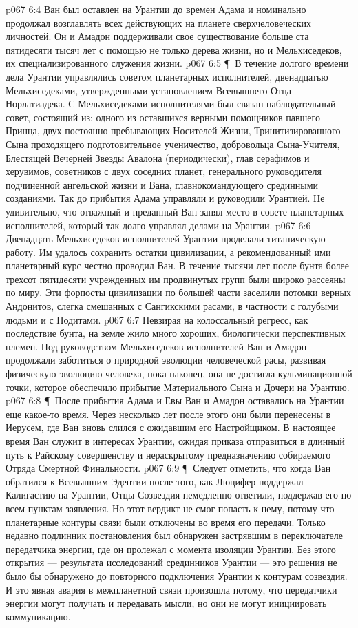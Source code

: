 \vs p067 6:4 Ван был оставлен на Урантии до времен Адама и номинально продолжал возглавлять всех действующих на планете сверхчеловеческих личностей. Он и Амадон поддерживали свое существование больше ста пятидесяти тысяч лет с помощью не только дерева жизни, но и Мельхиседеков, их специализированного служения жизни.
\vs p067 6:5 \P\ В течение долгого времени дела Урантии управлялись советом планетарных исполнителей, двенадцатью Мельхиседеками, утвержденными установлением Всевышнего Отца Норлатиадека. С Мельхиседеками\hyp{}исполнителями был связан наблюдательный совет, состоящий из: одного из оставшихся верными помощников павшего Принца, двух постоянно пребывающих Носителей Жизни, Тринитизированного Сына проходящего подготовительное ученичество, добровольца Сына\hyp{}Учителя, Блестящей Вечерней Звезды Авалона (периодически), глав серафимов и херувимов, советников с двух соседних планет, генерального руководителя подчиненной ангельской жизни и Вана, главнокомандующего срединными созданиями. Так до прибытия Адама управляли и руководили Урантией. Не удивительно, что отважный и преданный Ван занял место в совете планетарных исполнителей, который так долго управлял делами на Урантии.
\vs p067 6:6 Двенадцать Мельхиседеков\hyp{}исполнителей Урантии проделали титаническую работу. Им удалось сохранить остатки цивилизации, а рекомендованный ими планетарный курс честно проводил Ван. В течение тысячи лет после бунта более трехсот пятидесяти учрежденных им продвинутых групп были широко рассеяны по миру. Эти форпосты цивилизации по большей части заселили потомки верных Андонитов, слегка смешанных с Сангикскими расами, в частности с голубыми людьми и с Нодитами.
\vs p067 6:7 Невзирая на колоссальный регресс, как последствие бунта, на земле жило много хороших, биологически перспективных племен. Под руководством Мельхиседеков\hyp{}исполнителей Ван и Амадон продолжали заботиться о природной эволюции человеческой расы, развивая физическую эволюцию человека, пока наконец, она не достигла кульминационной точки, которое обеспечило прибытие Материального Сына и Дочери на Урантию.
\vs p067 6:8 \P\ После прибытия Адама и Евы Ван и Амадон оставались на Урантии еще какое\hyp{}то время. Через несколько лет после этого они были перенесены в Иерусем, где Ван вновь слился с ожидавшим его Настройщиком. В настоящее время Ван служит в интересах Урантии, ожидая приказа отправиться в длинный путь к Райскому совершенству и нераскрытому предназначению собираемого Отряда Смертной Финальности.
\vs p067 6:9 \P\ Следует отметить, что когда Ван обратился к Всевышним Эдентии после того, как Люцифер поддержал Калигастию на Урантии, Отцы Созвездия немедленно ответили, поддержав его по всем пунктам заявления. Но этот вердикт не смог попасть к нему, потому что планетарные контуры связи были отключены во время его передачи. Только недавно подлинник постановления был обнаружен застрявшим в переключателе передатчика энергии, где он пролежал с момента изоляции Урантии. Без этого открытия --- результата исследований срединников Урантии --- это решения не было бы обнаружено до повторного подключения Урантии к контурам созвездия. И это явная авария в межпланетной связи произошла потому, что передатчики энергии могут получать и передавать мысли, но они не могут инициировать коммуникацию.
